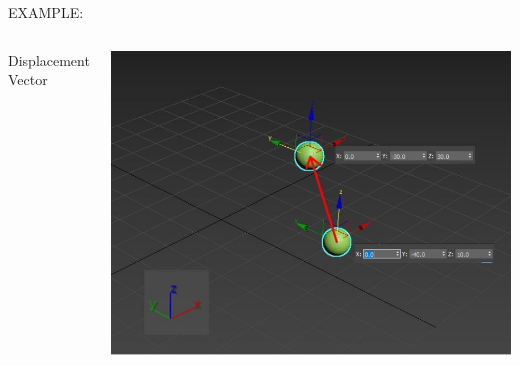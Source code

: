 \documentclass[]{beamer}
\begin{document}
  \begin{frame}
  
  
  EXAMPLE:
  
  
  
  
  
  
  
  \begin{columns}
  
   Displacement Vector
  
  
  
  \begin{center}
       \includegraphics[width=1.1\textwidth]{images/exampleVS4.jpg}      
       \end{center}
  
  
  \end{columns}
  
  
  
  
   \end{frame}
  
  
\end{document}
